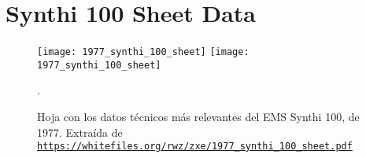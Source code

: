  \chapter[Synthi 100 sheet]{Synthi 100 Sheet Data}



\begin{figure}
	\centering
	\texttt{[image: 1977\_synthi\_100\_sheet]}
	\texttt{[image: 1977\_synthi\_100\_sheet]}
	\caption[]{Hoja con los datos técnicos más relevantes del EMS Synthi 100, de 1977.  Extraída de\\ \href{https://whitefiles.org/rwz/zxe/1977\_synthi\_100\_sheet.pdf}{\texttt{https://whitefiles.org/rwz/zxe/1977\_synthi\_100\_sheet.pdf}}}.
	\label{fig:synthi100_sheet}
\end{figure}